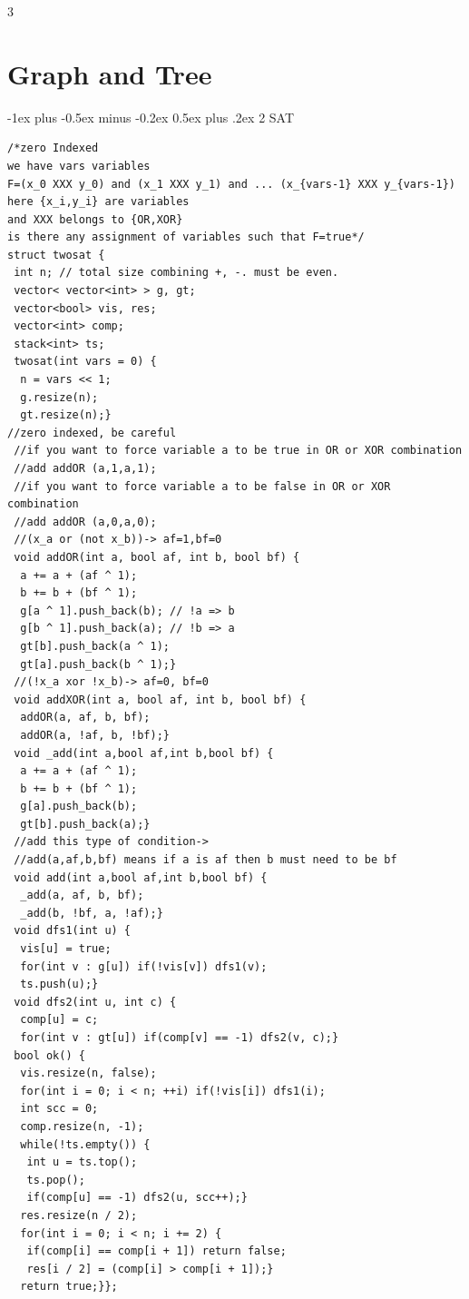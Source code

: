 \documentclass[8pt,a4paper,onesided]{article}
\makeatletter
\renewcommand{\subsection}{\@startsection{subsection}{2}{0mm}
    {-1ex plus -0.5ex minus -0.2ex} %
    {0.5ex plus .2ex}                %
    {\normalfont\large\bfseries}}    %
\makeatother
\begin{document}
\begin{multicols}{3}
\section{Graph and Tree}
\subsection{2 SAT}
\begin{verbatim}
/*zero Indexed
we have vars variables
F=(x_0 XXX y_0) and (x_1 XXX y_1) and ... (x_{vars-1} XXX y_{vars-1})
here {x_i,y_i} are variables
and XXX belongs to {OR,XOR}
is there any assignment of variables such that F=true*/
struct twosat {
 int n; // total size combining +, -. must be even.
 vector< vector<int> > g, gt;
 vector<bool> vis, res;
 vector<int> comp;
 stack<int> ts;
 twosat(int vars = 0) {
  n = vars << 1;
  g.resize(n);
  gt.resize(n);}
//zero indexed, be careful
 //if you want to force variable a to be true in OR or XOR combination
 //add addOR (a,1,a,1);
 //if you want to force variable a to be false in OR or XOR combination
 //add addOR (a,0,a,0);
 //(x_a or (not x_b))-> af=1,bf=0
 void addOR(int a, bool af, int b, bool bf) {
  a += a + (af ^ 1);
  b += b + (bf ^ 1);
  g[a ^ 1].push_back(b); // !a => b
  g[b ^ 1].push_back(a); // !b => a
  gt[b].push_back(a ^ 1);
  gt[a].push_back(b ^ 1);}
 //(!x_a xor !x_b)-> af=0, bf=0
 void addXOR(int a, bool af, int b, bool bf) {
  addOR(a, af, b, bf);
  addOR(a, !af, b, !bf);}
 void _add(int a,bool af,int b,bool bf) {
  a += a + (af ^ 1);
  b += b + (bf ^ 1);
  g[a].push_back(b);
  gt[b].push_back(a);}
 //add this type of condition->
 //add(a,af,b,bf) means if a is af then b must need to be bf
 void add(int a,bool af,int b,bool bf) {
  _add(a, af, b, bf);
  _add(b, !bf, a, !af);}
 void dfs1(int u) {
  vis[u] = true;
  for(int v : g[u]) if(!vis[v]) dfs1(v);
  ts.push(u);}
 void dfs2(int u, int c) {
  comp[u] = c;
  for(int v : gt[u]) if(comp[v] == -1) dfs2(v, c);}
 bool ok() {
  vis.resize(n, false);
  for(int i = 0; i < n; ++i) if(!vis[i]) dfs1(i);
  int scc = 0;
  comp.resize(n, -1);
  while(!ts.empty()) {
   int u = ts.top();
   ts.pop();
   if(comp[u] == -1) dfs2(u, scc++);}
  res.resize(n / 2);
  for(int i = 0; i < n; i += 2) {
   if(comp[i] == comp[i + 1]) return false;
   res[i / 2] = (comp[i] > comp[i + 1]);}
  return true;}};
\end{verbatim}

\end{multicols}
\end{document}
